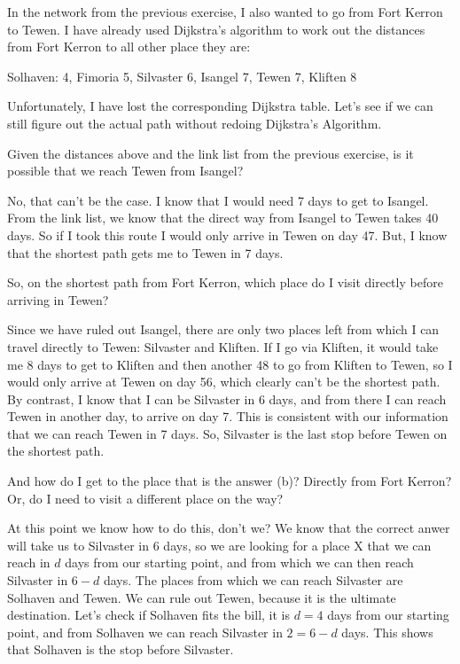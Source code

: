 
In the network from the previous exercise, I also wanted to go from Fort Kerron to Tewen. I have already used Dijkstra's algorithm to work out the distances from Fort Kerron to all other place they are:
\begin{center}
    Solhaven: 4, Fimoria 5, Silvaster 6, Isangel 7, Tewen 7, Kliften 8 
\end{center}
Unfortunately, I have lost the corresponding Dijkstra table. Let's see if we can still figure out the actual path without redoing Dijkstra's Algorithm. 

\subquestion Given the distances above and the link list from the previous exercise, is it possible that we reach Tewen from Isangel?

\solution
No, that can't be the case. I know that I would need 7 days to get to Isangel. From the link list, we know that the direct way from Isangel to Tewen takes 40 days. So if I took this route I would only arrive in Tewen on day 47. But, I know that the shortest path gets me to Tewen in 7 days.

\subquestion So, on the shortest path from Fort Kerron, which place do I visit directly before arriving in Tewen?

\solution
Since we have ruled out Isangel, there are only two places left from which I can travel directly to Tewen: Silvaster and Kliften. If I go via Kliften, it would take me 8 days to get to Kliften and then another 48 to go from Kliften to Tewen, so I would only arrive at Tewen on day 56, which clearly can't be the shortest path. By contrast, I know that I can be Silvaster in 6 days, and from there I can reach Tewen in another day, to arrive on day 7. This is consistent with our information that we can reach Tewen in 7 days. So, Silvaster is the last stop before Tewen on the shortest path. 

\subquestion And how do I get to the place that is the answer (b)? Directly from Fort Kerron? Or, do I need to visit a different place on the way?

\solution
At this point we know how to do this, don't we? We know that the correct anwer will take us to Silvaster in 6 days, so we are looking for a place X that we can reach in $d$ days from our starting point, and from which we can then reach Silvaster in $6-d$ days. The places from which we can reach Silvaster are Solhaven and Tewen. We can rule out Tewen, because it is the ultimate destination. Let's check if Solhaven fits the bill, it is $d=4$ days from our starting point, and from Solhaven we can reach Silvaster in $2=6-d$ days. This shows that Solhaven is the stop before Silvaster.     


